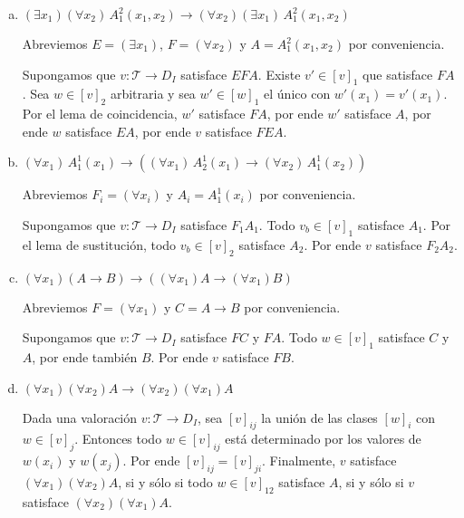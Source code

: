 \begin{enumerate}[(a)]
    \item $(\exists x_1) (\forall x_2) \, A_1^2(x_1, x_2) \to (\forall x_2) (\exists x_1) \, A_1^2(x_1, x_2)$
    \begin{solution}
    Abreviemos $E = (\exists x_1)$, $F = (\forall x_2)$ y $A = A_1^2(x_1, x_2)$ por conveniencia.
    
    Supongamos que $v : \mathscr T \to D_I$ satisface $EFA$. Existe $v' \in [v]_1$ que satisface $FA$. Sea $w \in [v]_2$ arbitraria y sea $w' \in [w]_1$ el único con $w'(x_1) = v'(x_1)$. Por el lema de coincidencia, $w'$ satisface $FA$, por ende $w'$ satisface $A$, por ende $w$ satisface $EA$, por ende $v$ satisface $FEA$.
    \end{solution}
    
    \item $(\forall x_1) \, A_1^1(x_1) \to ((\forall x_1) \, A_2^1(x_1) \to (\forall x_2) \, A_1^1(x_2))$
    \begin{solution}
    Abreviemos $F_i = (\forall x_i)$ y $A_i = A_1^1(x_i)$ por conveniencia.
    
    Supongamos que $v : \mathscr T \to D_I$ satisface $F_1 A_1$. Todo $v_b \in [v]_1$ satisface $A_1$. Por el lema de sustitución, todo $v_b \in [v]_2$ satisface $A_2$. Por ende $v$ satisface $F_2 A_2$.
    \end{solution}
    
    \item $(\forall x_1)(A \to B) \to ((\forall x_1) A \to (\forall x_1) B)$
    \begin{solution}
    Abreviemos $F = (\forall x_1)$ y $C = A \to B$ por conveniencia.
    
    Supongamos que $v : \mathscr T \to D_I$ satisface $FC$ y $FA$. Todo $w \in [v]_1$ satisface $C$ y $A$, por ende también $B$. Por ende $v$ satisface $FB$.
    \end{solution}
    
    \item $(\forall x_1) (\forall x_2) A \to (\forall x_2) (\forall x_1) A$
    \begin{solution}
    Dada una valoración $v : \mathscr T \to D_I$, sea $[v]_{ij}$ la unión de las clases $[w]_i$ con $w \in [v]_j$. Entonces todo $w \in [v]_{ij}$ está determinado por los valores de $w(x_i)$ y $w(x_j)$. Por ende $[v]_{ij} = [v]_{ji}$. Finalmente, $v$ satisface $(\forall x_1) (\forall x_2) A$, si y sólo si todo $w \in [v]_{12}$ satisface $A$, si y sólo si $v$ satisface $(\forall x_2) (\forall x_1) A$.
    \end{solution}
\end{enumerate}

